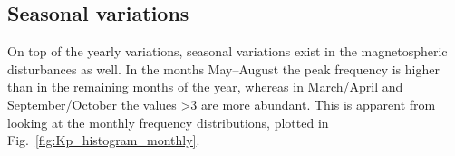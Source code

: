 \subsection{Seasonal variations}
On top of the yearly variations, seasonal variations exist in the magnetospheric disturbances as well. In the months May--August the \Kp{} peak frequency is higher than in the remaining months of the year, whereas in March/April and September/October the \Kp{} values \num{>3} are more abundant. This is apparent from looking at the monthly \Kp{} frequency distributions, plotted in Fig.~\ref{fig:Kp_histogram_monthly}.
\begin{figure}[htb]
	\begin{floatrow}
\end{floatrow}
\end{figure}
